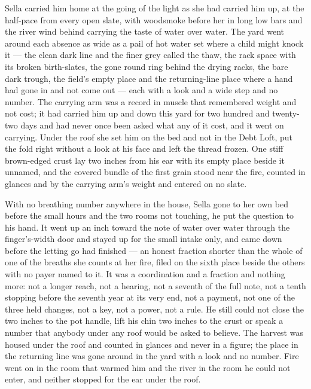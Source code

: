 Sella carried him home at the going of the light as she had carried him up, at the half-pace from every open slate, with woodsmoke before her in long low bars and the river wind behind carrying the taste of water over water. The yard went around each absence as wide as a pail of hot water set where a child might knock it --- the clean dark line and the finer grey called the thaw, the rack space with its broken birth-slates, the gone round ring behind the drying racks, the bare dark trough, the field's empty place and the returning-line place where a hand had gone in and not come out --- each with a look and a wide step and no number. The carrying arm was a record in muscle that remembered weight and not cost; it had carried him up and down this yard for two hundred and twenty-two days and had never once been asked what any of it cost, and it went on carrying. Under the roof she set him on the bed and not in the Debt Loft, put the fold right without a look at his face and left the thread frozen. One stiff brown-edged crust lay two inches from his ear with its empty place beside it unnamed, and the covered bundle of the first grain stood near the fire, counted in glances and by the carrying arm's weight and entered on no slate.

With no breathing number anywhere in the house, Sella gone to her own bed before the small hours and the two rooms not touching, he put the question to his hand. It went up an inch toward the note of water over water through the finger's-width door and stayed up for the small intake only, and came down before the letting go had finished --- an honest fraction shorter than the whole of one of the breaths she counts at her fire, filed on the sixth place beside the others with no payer named to it. It was a coordination and a fraction and nothing more: not a longer reach, not a hearing, not a seventh of the full note, not a tenth stopping before the seventh year at its very end, not a payment, not one of the three held changes, not a key, not a power, not a rule. He still could not close the two inches to the pot handle, lift his chin two inches to the crust or speak a number that anybody under any roof would be asked to believe. The harvest was housed under the roof and counted in glances and never in a figure; the place in the returning line was gone around in the yard with a look and no number. Fire went on in the room that warmed him and the river in the room he could not enter, and neither stopped for the ear under the roof.
